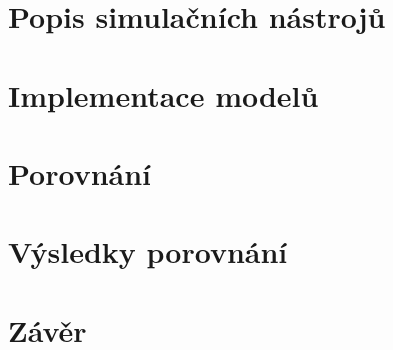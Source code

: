 \chapter{Popis simulačních nástrojů}
\label{kapitola3}

\chapter{Implementace modelů}
\label{kapitola4}

\chapter{Porovnání}
\label{kapitola5}

\chapter{Výsledky porovnání}
\label{kapitola6}

\chapter{Závěr}
\label{kapitola7}





